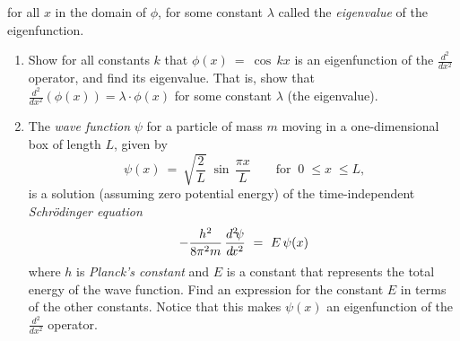 {\begin{enumerate}[\bfseries 1.]
\begin{center}
 \end{center}
  for all $x$ in the domain of $\phi$, for some constant $\lambda$ called the
  \emph{eigenvalue} of the eigenfunction.
  \begin{enumerate}[\bfseries (a)]
   \item Show for all constants $k$ that $\phi(x) ~=~ \cos\,kx$ is an
    eigenfunction of the $\frac{d^2}{d\!x^2}$ operator, and find its eigenvalue.
    That is, show that $\frac{d^2}{d\!x^2}(\phi(x)) = \lambda \cdot \phi(x)$ for
    some constant $\lambda$ (the eigenvalue).
   \item The \emph{wave function} $\psi$ for a particle of mass $m$ moving in a
    one-dimensional box of length $L$, given by
    \begin{displaymath}
     \psi(x) ~=~ \sqrt{\frac{2}{L}}\;\sin\,\frac{\pi x}{L} \qquad\text{for
     $~0 \;\le x \;\le L$,}
	\end{displaymath}
    is a solution (assuming zero potential energy) of the time-independent
    \emph{Schr\"{o}dinger equation}
    \begin{displaymath}
     -\frac{h^2}{8\pi^2 m}\,\frac{d^2 \negmedspace\psi}{d\!x^2} ~=~ 
	 E\,\psi(x)
	\end{displaymath}
    where $h$ is \emph{Planck's constant}
    and $E$ is a constant that represents the total energy of the wave function.
    Find an expression for the constant $E$ in terms of the other constants.
    Notice that this makes $\psi(x)$ an
    eigenfunction of the $\frac{d^2}{d\!x^2}$ operator.
  \end{enumerate}
\end{enumerate}}
